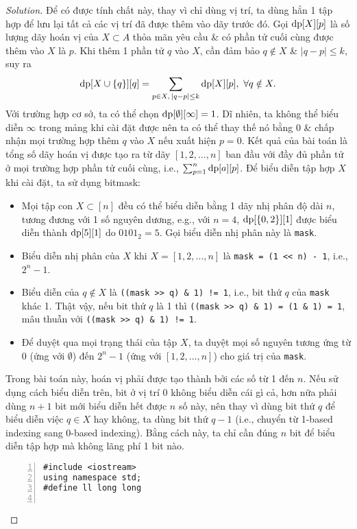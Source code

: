 \documentclass{article}
\begin{document}
\begin{proof}[Solution]
    Để có được tính chất này, thay vì chỉ dùng vị trí, ta dùng hẳn 1 tập hợp để lưu lại tất cả các vị trí đã được thêm vào dãy trước đó. Gọi ${\rm dp}[X][p]$ là số lượng dãy hoán vị của $X\subset A$ thỏa mãn yêu cầu \& có phần tử cuối cùng được thêm vào $X$ là $p$. Khi thêm 1 phần tử $q$ vào $X$, cần đảm bảo $q\notin X$ \& $|q - p|\le k$, suy ra
    \begin{equation*}
        {\rm dp}[X\cup\{q\}][q] = \sum_{p\in X,\,|q - p|\le k} {\rm dp}[X][p],\ \forall q\notin X.
    \end{equation*}
    Với trường hợp cơ sở, ta có thể chọn ${\rm dp}[\emptyset][\infty] = 1$. Dĩ nhiên, ta không thể biểu diễn $\infty$ trong mảng khi cài đặt được nên ta có thể thay thế nó bằng $0$ \& chấp nhận mọi trường hợp thêm $q$ vào $X$ nếu xuất hiện $p = 0$. Kết quả của bài toán là tổng số dãy hoán vị được tạo ra từ dãy $[1,2,\ldots,n]$ ban đầu với đầy đủ phần tử ở mọi trường hợp phần tử cuối cùng, i.e., $\sum_{p=1}^n {\rm dp}[a][p]$. Để biểu diễn tập hợp $X$ khi cài đặt, ta sử dụng bitmask:
    \begin{itemize}
        \item Mọi tập con $X\subset[n]$ đều có thể biểu diễn bằng 1 dãy nhị phân độ dài $n$, tương đương với 1 số nguyên dương, e.g., với $n = 4$, ${\rm dp}[\{0,2\}][1]$ được biểu diễn thành ${\rm dp}[5][1]$ do $0101_2 = 5$. Gọi biểu diễn nhị phân này là {\tt mask}.
        \item Biểu diễn nhị phân của $X$ khi $X = [1,2,\ldots,n]$ là \verb|mask = (1 << n) - 1|, i.e., $2^n - 1$.
        \item Biểu diễn của $q\notin X$ là \verb|((mask >> q) & 1) != 1|, i.e., bit thứ $q$ của {\tt mask} khác 1. Thật vậy, nếu bit thứ $q$ là 1 thì \verb|((mask >> q) & 1) = (1 & 1) = 1|, mâu thuẫn với \verb|((mask >> q) & 1) != 1|.
        \item Để duyệt qua mọi trạng thái của tập $X$, ta duyệt mọi số nguyên tương ứng từ 0 (ứng với $\emptyset$) đến $2^n - 1$ (ứng với $[1,2,\ldots,n]$) cho giá trị của {\tt mask}.
    \end{itemize}
    Trong bài toán này, hoán vị phải được tạo thành bởi các số từ 1 đến $n$. Nếu sử dụng cách biểu diễn trên, bit ở vị trí 0 không biểu diễn cái gì cả, hơn nữa phải dùng $n + 1$ bit mới biểu diễn hết được $n$ số này, nên thay vì dùng bit thứ $q$ để biểu diễn việc $q\in X$ hay không, ta dùng bit thứ $q - 1$ (i.e., chuyển từ 1-based indexing sang 0-based indexing). Bằng cách này, ta chỉ cần đúng $n$ bit để biểu diễn tập hợp mà không lãng phí 1 bit nào.
    \begin{Verbatim}[numbers=left,xleftmargin=5mm]
#include <iostream>
using namespace std;
#define ll long long


\end{Verbatim}
\end{proof}
\end{document}
